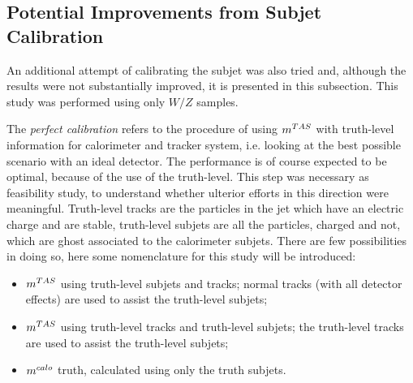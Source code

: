 \subsection{Potential Improvements from Subjet Calibration}

An additional attempt of calibrating the subjet was also tried and, although the results were not substantially improved, it is presented in this subsection. This study was performed using only $W/Z$ samples.

The \textit{perfect calibration} refers to the procedure of using $m^{TAS}$ with truth-level information for calorimeter and tracker system, i.e. looking at the best possible scenario with an ideal detector. The performance is of course expected to be optimal, because of the use of the truth-level. This step was necessary as feasibility study, to understand whether ulterior efforts in this direction were meaningful.
Truth-level tracks are the particles in the jet which have an electric charge and are stable, truth-level subjets are all the particles, charged and not, which are ghost associated to the calorimeter subjets.
There are few possibilities in doing so, here some nomenclature for this study will be introduced:
\begin{itemize}
 \item $m^{TAS}$ using truth-level subjets and tracks; normal tracks (with all detector effects) are used to assist the truth-level subjets;
 \item $m^{TAS}$ using truth-level tracks and truth-level subjets; the truth-level tracks are used to assist the truth-level subjets;
 \item $m^{calo}$ truth, calculated using only the truth subjets.
\end{itemize}







